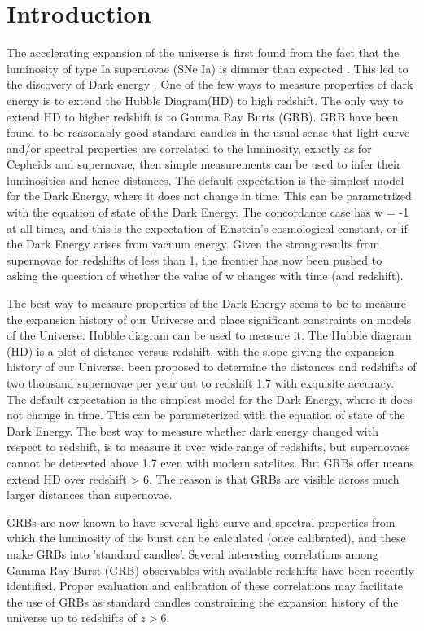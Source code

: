 \section{Introduction}
The accelerating expansion of the universe is first found from the fact that the luminosity of type Ia supernovae (SNe Ia) is dimmer than expected \cite{riess1998observational}. This led to the discovery of Dark energy \cite{perlmutter1999measurements}. One of the few ways to measure properties of dark energy is to extend the Hubble Diagram(HD) to high redshift. The only way to extend HD to higher redshift is to Gamma Ray Burts (GRB). GRB have been found to be reasonably good standard candles in the usual sense that light curve and/or spectral properties are correlated to the luminosity, exactly as for Cepheids and supernovae, then simple measurements can be used to infer their luminosities and hence distances. The default expectation is the simplest model for the Dark Energy, where it does not change in time. This can be parametrized with the equation of state of the Dark Energy. The concordance case has w = -1 at all times, and this is the expectation of Einstein’s cosmological constant, or if the Dark Energy arises from vacuum energy. Given the strong results from supernovae for redshifts of less than 1, the frontier has now been pushed to asking the question of whether the value of w changes with time (and redshift).

The best way to measure properties of the Dark Energy seems to be to measure the expansion history of our Universe and place significant constraints on models of the Universe. Hubble diagram can be used to measure it. The Hubble diagram (HD) is a plot of distance versus redshift, with the slope giving the expansion history of our Universe. been proposed to determine the distances and redshifts of two thousand supernovae per year out to redshift 1.7 with exquisite accuracy. The default expectation is the simplest model for the Dark Energy, where it does not change in time. This can be parameterized with the equation of state of the Dark Energy. The best way to measure whether dark energy changed with respect to redshift, is to measure it over wide range of redshifts, but supernovaes cannot be deteceted above 1.7 even with modern satelites. But GRBs offer means extend HD over redshift > 6. The reason is that GRBs are visible across much larger distances than supernovae.

GRBs are now known to have several light curve and spectral properties from which the luminosity of the burst can be calculated (once calibrated), and these make GRBs into ’standard candles’. Several interesting correlations among Gamma Ray Burst (GRB) observables with available redshifts have been recently identified. Proper evaluation and calibration of these correlations may facilitate the use of GRBs as standard candles constraining the expansion history of the universe up to redshifts of $z > 6$.